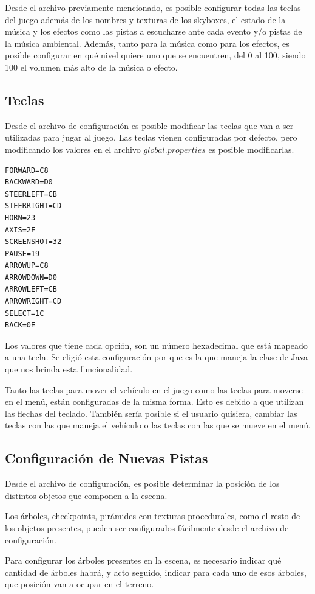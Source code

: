 \documentclass[a4paper,10pt]{article}
\begin{document}
Desde el archivo previamente mencionado, es posible configurar todas las teclas
del juego adem\'as de los nombres y texturas de los skyboxes, el estado de la
m\'usica y los efectos como las pistas a escucharse ante cada evento y/o pistas
de la m\'usica ambiental.  Adem\'as, tanto para la m\'usica como para los
efectos,
es
posible configurar en qu\'e nivel quiere uno que se encuentren, del 0 al 100,
siendo 100 el volumen m\'as alto de la m\'usica o efecto.

\subsection{Teclas}

Desde el archivo de configuraci\'on es posible modificar las teclas que van a
ser utilizadas para jugar al juego.  Las teclas vienen configuradas por
defecto, pero modificando los valores en el archivo $global.properties$ es
posible modificarlas.

\begin{verbatim}
FORWARD=C8
BACKWARD=D0
STEERLEFT=CB
STEERRIGHT=CD
HORN=23
AXIS=2F
SCREENSHOT=32
PAUSE=19
ARROWUP=C8
ARROWDOWN=D0
ARROWLEFT=CB
ARROWRIGHT=CD
SELECT=1C
BACK=0E
\end{verbatim}

Los valores que tiene cada opci\'on, son un n\'umero hexadecimal que est\'a
mapeado a una tecla.  Se eligi\'o esta configuraci\'on por que es la que maneja
la clase de Java que nos brinda esta funcionalidad.

Tanto las teclas para mover el veh\'iculo en el juego como las teclas para
moverse en el men\'u, est\'an configuradas de la misma forma.  Esto es debido a
que utilizan las flechas del teclado.  Tambi\'en ser\'ia posible si el usuario
quisiera, cambiar las teclas con las que maneja el veh\'iculo o las teclas con
las que se mueve en el men\'u.


\subsection{Configuraci\'on de Nuevas Pistas}

Desde el archivo de configuraci\'on, es posible determinar la posici\'on de los
distintos objetos que componen a la escena.

Los \'arboles, checkpoints, pir\'amides con texturas procedurales, como el resto
de
los objetos presentes, pueden ser configurados f\'acilmente desde el archivo de
configuraci\'on.

Para configurar los \'arboles presentes en la escena, es necesario indicar qu\'e
cantidad de \'arboles habr\'a, y acto seguido, indicar para cada uno de esos
\'arboles, que posici\'on van a ocupar en el terreno.
\end{document}
